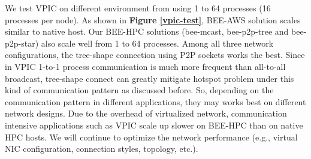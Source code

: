 We test VPIC on different environment from using 1 to 64 processes (16 processes per node). As shown in \textbf{Figure \ref{vpic-test}}, BEE-AWS solution scales similar to native host.  Our BEE-HPC solutions (bee-mcast, bee-p2p-tree and bee-p2p-star) also scale well from 1 to 64 processes. Among all three network configurations, the tree-shape connection using P2P sockets works the best. Since in VPIC 1-to-1 process communication is much more frequent than all-to-all broadcast, tree-shape connect can greatly mitigate hotspot problem under this kind of communication pattern as discussed before. So, depending on the communication pattern in different applications, they may works best on different network designs. Due to the overhead of virtualized network, communication intensive applications such as VPIC scale up slower on BEE-HPC than on native HPC hosts. We will continue to optimize the network performance (e.g., virtual NIC configuration, connection styles, topology, etc.).
